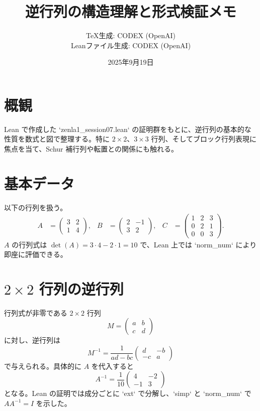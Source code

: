 \documentclass[12pt]{ltjsarticle}
\title{逆行列の構造理解と形式検証メモ}
\author{TeX生成: CODEX (OpenAI) \\ Leanファイル生成: CODEX (OpenAI)}
\date{2025年9月19日}
\begin{document}
\maketitle

\section{概観}
Lean で作成した `zenla1\_session07.lean` の証明群をもとに、逆行列の基本的な性質を数式と図で整理する。特に $2\times2$、$3\times3$ 行列、そしてブロック行列表現に焦点を当て、Schur 補行列や転置との関係にも触れる。

\section{基本データ}
以下の行列を扱う。
\begin{align*}
A &= \begin{pmatrix} 3 & 2 \\ 1 & 4 \end{pmatrix}, &
B &= \begin{pmatrix} 2 & -1 \\ 3 & 2 \end{pmatrix}, &
C &= \begin{pmatrix} 1 & 2 & 3 \\ 0 & 2 & 1 \\ 0 & 0 & 3 \end{pmatrix}.
\end{align*}
$A$ の行列式は $\det(A)=3\cdot4-2\cdot1=10$ で、Lean 上では `norm_num` により即座に評価できる。

\section{$2\times2$ 行列の逆行列}
行列式が非零である $2\times2$ 行列
\[
M = \begin{pmatrix} a & b \\ c & d \end{pmatrix}
\]
に対し、逆行列は
\[
M^{-1} = \frac{1}{ad-bc}\begin{pmatrix} d & -b \\ -c & a \end{pmatrix}
\]
で与えられる。具体的に $A$ を代入すると
\[
A^{-1} = \frac{1}{10}\begin{pmatrix}4 & -2\\-1 & 3\end{pmatrix}
\]
となる。Lean の証明では成分ごとに `ext` で分解し、`simp` と `norm_num` で $AA^{-1}=I$ を示した。
\end{document}
